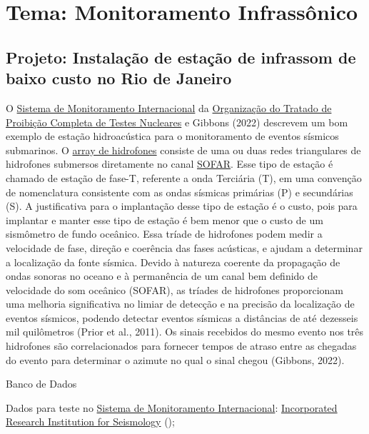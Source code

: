 \documentclass[10pt,a4paper,oneside]{book}
\begin{document}
\section{Tema: Monitoramento Infrassônico}

\subsection{Projeto: Instalação de estação de infrassom de baixo custo no Rio de Janeiro}

O \href{https://www.ctbto.org/our-work/international-monitoring-system}{Sistema de Monitoramento Internacional} da \href{https://funag.gov.br/biblioteca/download/934-Tratado_de_Proibicao_Completa_dos_Testes_Nucleares_CTBT.pdf}{Organização do Tratado de Proibição Completa de Testes Nucleares} e Gibbons (2022) descrevem um bom exemplo de estação hidroacústica para o monitoramento de eventos sísmicos submarinos. O \href{https://www.ctbto.org/our-work/monitoring-technologies/hydroacoustic-monitoring}{array de hidrofones} consiste de uma ou duas redes triangulares de hidrofones submersos diretamente no canal \href{https://pt.wikipedia.org/wiki/Canal_SOFAR}{SOFAR}. Esse tipo de estação é chamado de estação de fase-T, referente a onda Terciária (T), em uma convenção de nomenclatura consistente com as ondas sísmicas primárias (P) e secundárias (S). A justificativa para o implantação desse tipo de estação é o custo, pois para implantar e manter esse tipo de estação é bem menor que o custo de um sismômetro de fundo oceânico. Essa tríade de hidrofones podem medir a velocidade de fase, direção e coerência das fases acústicas, e ajudam a determinar a localização da fonte sísmica. Devido à natureza coerente da propagação de ondas sonoras no oceano e à permanência de um canal bem definido de velocidade do som oceânico (SOFAR), as tríades de hidrofones proporcionam uma melhoria significativa no limiar de detecção e na precisão da localização de eventos sísmicos, podendo detectar eventos sísmicas a distâncias de até dezesseis mil quilômetros (Prior et al., 2011). Os sinais recebidos do mesmo evento nos três hidrofones são correlacionados para fornecer tempos de atraso entre as chegadas do evento para determinar o azimute no qual o sinal chegou (Gibbons, 2022).

\begin{fancyenum}{\faDatabase}{Banco de Dados}
	\item Dados para teste no \href{https://www.ctbto.org/our-work/international-monitoring-system}{Sistema de Monitoramento Internacional}: \href{https://ds.iris.edu/gmap/\#network=IM\&planet=earth}{Incorporated Research Institution for Seismology} (\faUnlock);
\end{fancyenum}
\end{document}
